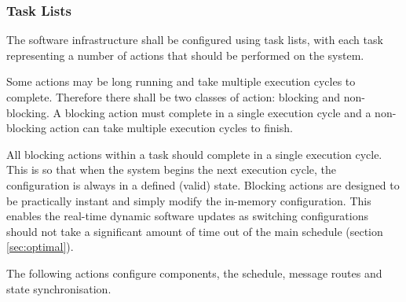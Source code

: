 \subsubsection{Task Lists}
The software infrastructure shall be configured using task lists, with each task representing a number of actions that should be performed on the system.

Some actions may be long running and take multiple execution cycles to complete. Therefore there shall be two classes of action: blocking and non-blocking. A blocking action must complete in a single execution cycle and a non-blocking action can take multiple execution cycles to finish.

All blocking actions within a task should complete in a single execution cycle. This is so that when the system begins the next execution cycle, the configuration is always in a defined (valid) state. Blocking actions are designed to be practically instant and simply modify the in-memory configuration. This enables the real-time dynamic software updates as switching configurations should not take a significant amount of time out of the main schedule (section \ref{sec:optimal}).

The following actions configure components, the schedule, message routes and state synchronisation.

